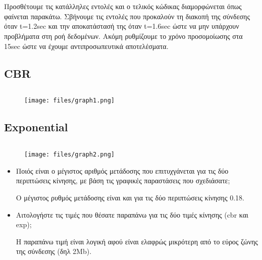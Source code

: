 \documentclass[a4paper,9pt]{article}
\begin{document}
\section{}


Προσθέτουμε τις κατάλληλες εντολές και ο τελικός κώδικας διαμορφώνεται όπως
φαίνεται παρακάτω. Σβήνουμε τις εντολές που προκαλούν τη διακοπή της σύνδεσης
όταν t=1.2sec  και την αποκατάστασή της όταν t=1.6sec ώστε να μην υπάρχουν
προβλήματα στη ροή δεδομένων. Ακόμη ρυθμίζουμε το χρόνο προσομοίωσης στα 15sec
ώστε να έχουμε αντιπροσωπευτικά αποτελέσματα.

\subsection{CBR}
\inputminted[fontsize=\footnotesize]{tcl}{files/ex3_4a1.tcl}

\begin{figure}[H]
    \centering
    \texttt{[image: files/graph1.png]}
\end{figure}

\subsection{Exponential}
\inputminted[fontsize=\footnotesize]{tcl}{files/ex3_4a2.tcl}
\begin{figure}[H]
    \centering
    \texttt{[image: files/graph2.png]}
\end{figure}

\begin{itemize}
    \item Ποιός είναι ο μέγιστος αριθμός μετάδοσης που επιτυχγάνεται για τις δύο
        περιπτώσεις κίνησης, με βάση τις γραφικές παραστάσεις που σχεδιάσατε;

        Ο μέγιστος ρυθμός μετάδοσης είναι και για τις δύο περιπτώσεις κίνησης 0.18.
    \item Αιτολογήστε τις τιμές που θέσατε παραπάνω για τις δύο τιμές κίνησης (cbr
        και exp);

        H παραπάνω τιμή είναι λογική αφού είναι ελαφρώς μικρότερη από το εύρος ζώνης
        της σύνδεσης (δηλ 2Mb).
\end{itemize}
\end{document}
